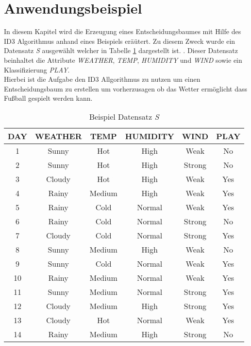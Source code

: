 \section{Anwendungsbeispiel}
\label{id3:datensatz}
In diesem Kapitel wird die Erzeugung eines Entscheidungsbaumes mit Hilfe des ID3 Algorithmus anhand eines Beispiels eräütert. Zu diesem Zweck wurde ein Datensatz \textit{S} ausgewählt welcher in Tabelle \ref{table:datensatz-original} dargestellt ist. \Autocite{ImplementationID3}. Dieser Datensatz beinhaltet die Attribute \textit{WEATHER}, \textit{TEMP}, \textit{HUMIDITY} und \textit{WIND} sowie ein Klassifizierung \textit{PLAY}.\\
Hierbei ist die Aufgabe den ID3 Allgorithmus zu nutzen um einen Entscheidungsbaum zu erstellen um vorherzusagen ob das Wetter ermöglicht dass Fußball gespielt werden kann.

\begin{table}[htbp]
    \centering
    \begin{tabular}{cccccc}
        \toprule
        \textbf{DAY} & \textbf{WEATHER} & \textbf{TEMP} & \textbf{HUMIDITY} & \textbf{WIND} & \textbf{PLAY} \\
        \toprule
        1   &Sunny	&Hot	&High	&Weak	&No  \\
        2   &Sunny	&Hot	&High	&Strong	&No  \\
        3   &Cloudy	&Hot	&High	&Weak	&Yes \\
        4   &Rainy	&Medium	&High	&Weak	&Yes \\
        5   &Rainy	&Cold	&Normal	&Weak	&Yes \\
        6   &Rainy	&Cold	&Normal	&Strong	&No  \\
        7   &Cloudy	&Cold	&Normal	&Strong	&Yes \\
        8   &Sunny	&Medium	&High	&Weak	&No  \\
        9   &Sunny	&Cold	&Normal	&Weak	&Yes \\
        10  &Rainy	&Medium	&Normal	&Weak	&Yes \\
        11  &Sunny	&Medium	&Normal	&Strong	&Yes \\
        12  &Cloudy	&Medium	&High	&Strong	&Yes \\
        13  &Cloudy	&Hot	&Normal	&Weak	&Yes \\
        14  &Rainy	&Medium	&High	&Strong	&No  \\
        \bottomrule
    \end{tabular}
    \caption{Beispiel Datensatz \textit{S}}
    \label{table:datensatz-original}
\end{table}

